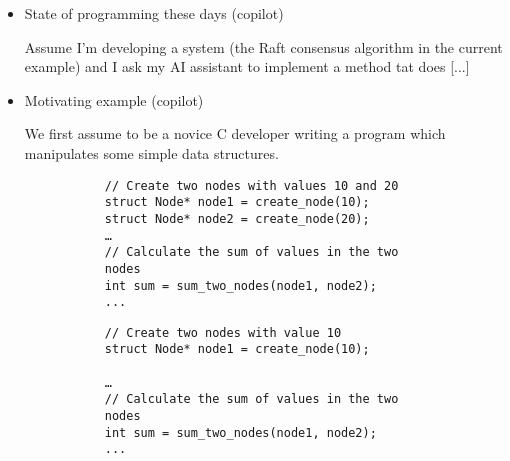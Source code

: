 \begin{itemize}
\item State of programming these days (copilot)

Assume I'm developing a system (the Raft consensus algorithm in the current example) and I ask my AI assistant to implement a method 
tat does [...]

\item Motivating example (copilot)

We first assume to be a novice C developer writing a program which manipulates some simple data structures. 

\begin{figure}[t]
{\footnotesize
\begin{subfigure}{0.49\textwidth}
\begin{verbatim}
// Create two nodes with values 10 and 20
struct Node* node1 = create_node(10);
struct Node* node2 = create_node(20);
…
// Calculate the sum of values in the two nodes
int sum = sum_two_nodes(node1, node2);
...
\end{verbatim}
\label{fig:exnull-manifest}
  \end{subfigure}
}
{\footnotesize
\begin{subfigure}{0.49\textwidth}
\begin{verbatim}
// Create two nodes with value 10 
struct Node* node1 = create_node(10);

…
// Calculate the sum of values in the two nodes
int sum = sum_two_nodes(node1, node2);
...
\end{verbatim}
\label{fig:exnull-manifest}
  \end{subfigure}
}
\\~\\~\\
{\footnotesize
\begin{subfigure}{0.49\textwidth}
\begin{verbatim}



\end{verbatim}
\end{subfigure}}
\end{figure}
\end{itemize}
